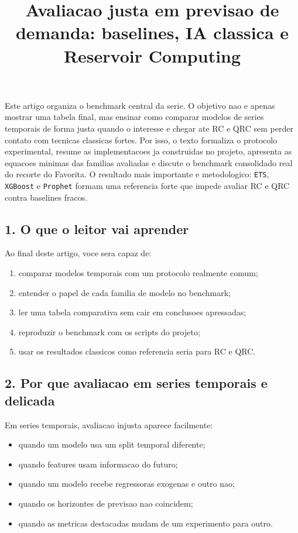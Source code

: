 \documentclass[12pt]{article}
\title{Avaliacao justa em previsao de demanda: baselines, IA classica e Reservoir Computing}
\author{}
\providecommand{\tightlist}{%
          \setlength{\itemsep}{0pt}\setlength{\parskip}{0pt}}
\begin{document}
        \maketitle

        \begin{resumo}
        Este artigo organiza o benchmark central da serie. O objetivo nao e apenas mostrar uma tabela final, mas ensinar como comparar modelos de series temporais de forma justa quando o interesse e chegar ate RC e QRC sem perder contato com tecnicas classicas fortes. Por isso, o texto formaliza o protocolo experimental, resume as implementacoes ja construidas no projeto, apresenta as equacoes minimas das familias avaliadas e discute o benchmark consolidado real do recorte do Favorita. O resultado mais importante e metodologico: \texttt{ETS}, \texttt{XGBoost} e \texttt{Prophet} formam uma referencia forte que impede avaliar RC e QRC contra baselines fracos.
        \end{resumo}

        \subsection{1. O que o leitor vai aprender}\label{1-o-que-o-leitor-vai-aprender}

Ao final deste artigo, voce sera capaz de:

\begin{enumerate}
\def\labelenumi{\arabic{enumi}.}
\tightlist
\item
  comparar modelos temporais com um protocolo realmente comum;
\item
  entender o papel de cada familia de modelo no benchmark;
\item
  ler uma tabela comparativa sem cair em conclusoes apressadas;
\item
  reproduzir o benchmark com os scripts do projeto;
\item
  usar os resultados classicos como referencia seria para RC e QRC.
\end{enumerate}

\subsection{2. Por que avaliacao em series temporais e delicada}\label{2-por-que-avaliacao-em-series-temporais-e-delicada}

Em series temporais, avaliacao injusta aparece facilmente:

\begin{itemize}
\tightlist
\item
  quando um modelo usa um split temporal diferente;
\item
  quando features usam informacao do futuro;
\item
  quando um modelo recebe regressoras exogenas e outro nao;
\item
  quando os horizontes de previsao nao coincidem;
\item
  quando as metricas destacadas mudam de um experimento para outro.
\end{itemize}
\end{document}
